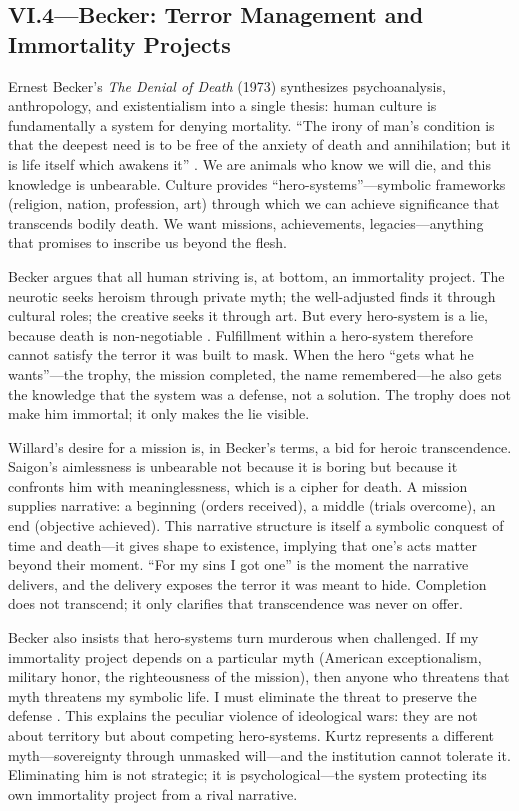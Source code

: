 \subsection*{VI.4—Becker: Terror Management and Immortality Projects}
\label{ssec:vi-becker}

Ernest Becker's \textit{The Denial of Death} (1973) synthesizes psychoanalysis, anthropology,
and existentialism into a single thesis: human culture is fundamentally a system for denying
mortality. ``The irony of man's condition is that the deepest need is to be free of the
anxiety of death and annihilation; but it is life itself which awakens it''
\parencite[p.~66]{BeckerDenial1973}. We are animals who know we will die, and this knowledge
is unbearable. Culture provides ``hero-systems''---symbolic frameworks (religion, nation,
profession, art) through which we can achieve significance that transcends bodily death. We
want missions, achievements, legacies---anything that promises to inscribe us beyond the flesh.

Becker argues that all human striving is, at bottom, an immortality project. The neurotic
seeks heroism through private myth; the well-adjusted finds it through cultural roles; the
creative seeks it through art. But every hero-system is a lie, because death is non-negotiable
\parencite[pp.~26--27]{BeckerDenial1973}. Fulfillment within a hero-system therefore cannot
satisfy the terror it was built to mask. When the hero ``gets what he wants''---the trophy,
the mission completed, the name remembered---he also gets the knowledge that the system was a
defense, not a solution. The trophy does not make him immortal; it only makes the lie visible.

Willard's desire for a mission is, in Becker's terms, a bid for heroic transcendence. Saigon's
aimlessness is unbearable not because it is boring but because it confronts him with
meaninglessness, which is a cipher for death. A mission supplies narrative: a beginning
(orders received), a middle (trials overcome), an end (objective achieved). This narrative
structure is itself a symbolic conquest of time and death---it gives shape to existence,
implying that one's acts matter beyond their moment. ``For my sins I got one'' is the moment
the narrative delivers, and the delivery exposes the terror it was meant to hide. Completion
does not transcend; it only clarifies that transcendence was never on offer.

Becker also insists that hero-systems turn murderous when challenged. If my immortality
project depends on a particular myth (American exceptionalism, military honor, the righteousness
of the mission), then anyone who threatens that myth threatens my symbolic life. I must
eliminate the threat to preserve the defense \parencite[pp.~123--125]{BeckerDenial1973}. This
explains the peculiar violence of ideological wars: they are not about territory but about
competing hero-systems. Kurtz represents a different myth---sovereignty through unmasked
will---and the institution cannot tolerate it. Eliminating him is not strategic; it is
psychological---the system protecting its own immortality project from a rival narrative.

